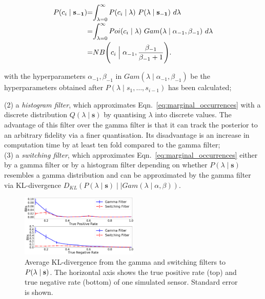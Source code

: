 \begin{equation}
\label{eq:unconditional_xi_gamma_filter}
\begin{tabular}{r@{=}l}
$P(c_i \mid \mathbf{s_{-1}})$ & $\displaystyle\int_{\lambda=0}^{\infty} P(c_i \mid \lambda) ~ P(\lambda \mid \mathbf{s_{-1}}) ~d\lambda$ \\ [2ex]
& $\displaystyle\int_{\lambda=0}^{\infty} Poi(c_i \mid \lambda) ~ Gam(\lambda \mid \alpha_{-1}, \beta_{-1}) ~d\lambda$ \\ [2ex]
& $NB\Bigg(c_i \Bigm| \alpha_{-1}, \displaystyle\frac{\beta_{-1}}{\beta_{-1} + 1}\Bigg)$.
\end{tabular}
\end{equation}

\noindent with the hyperparameters $\alpha_{-1}, \beta_{-1}$ in $Gam(\lambda \mid \alpha_{-1}, \beta_{-1})$ be the hyperparameters obtained after $P(\lambda \mid s_1, \ldots, s_{i-1})$ has been calculated;

(2) a \textit{histogram filter}, which approximates Eqn.~\ref{eq:marginal_occurrences} with a discrete distribution $Q(\lambda \mid \mathbf{s})$ by quantising $\lambda$ into discrete values. The advantage of this filter over the gamma filter is that it can track the posterior to an arbitrary fidelity via a finer quantisation. Its disadvantage is an increase in computation time by at least ten fold compared to the gamma filter; \\
(3) a \textit{switching filter}, which approximates Eqn.~\ref{eq:marginal_occurrences} either by a gamma filter or by a histogram filter depending on whether $P(\lambda \mid \mathbf{s})$  resembles a gamma distribution and can be approximated by the gamma filter via KL-divergence $D_{KL}(P(\lambda \mid \mathbf{s}) \mid \mid Gam(\lambda \mid \alpha, \beta))$.

\begin{figure}[t!]
	\centering
	\includegraphics[width=0.5\textwidth]{./figures/kl_div_tpr_tnr_var.png}
	\caption{Average KL-divergence from the gamma and switching filters to $P(\lambda \mid \protect\mathbf{s})$. The horizontal axis shows the true positive rate (top) and true negative rate (bottom) of one simulated sensor. Standard error is shown.} 
	\label{fig:kl_div_tpr_tnr_var}
\end{figure}

